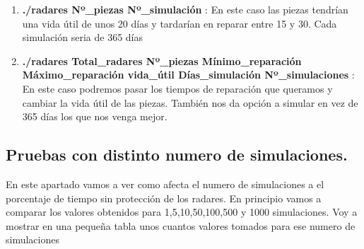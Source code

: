 \documentclass[]{article}
\begin{document}
 \begin{enumerate}
 	\item \textbf{./radares Nº\_piezas Nº\_simulación} : En este caso las piezas tendrían una vida útil de unos 20 días y tardarían en reparar entre 15 y 30. Cada simulación seria de 365 días
 	
 	\item \textbf{./radares Total\_radares Nº\_piezas Mínimo\_reparación Máximo\_reparación vida\_útil Días\_simulación Nº\_simulaciones} : En este caso podremos pasar los tiempos de reparación que queramos y cambiar la vida útil de las piezas. También nos da opción a simular en vez de 365 días los que nos venga mejor.
 \end{enumerate}

 
\subsection{Pruebas con distinto numero de simulaciones.}
En este apartado vamos a ver como afecta el numero de simulaciones a el porcentaje de tiempo sin protección de los radares. En principio vamos a comparar los valores obtenidos para 1,5,10,50,100,500 y 1000 simulaciones. Voy a mostrar en una pequeña tabla unos cuantos valores tomados para ese numero de simulaciones
\end{document}
